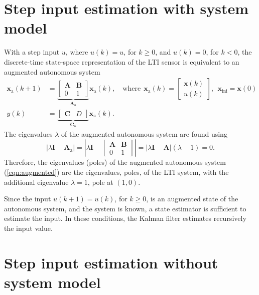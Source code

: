 \section{Step input estimation with system model}

With a step input ${u}$, where $u(k) = u$, for $k \geq 0$, and $u(k) = 0$, for $k < 0$, the discrete-time state-space representation of the LTI sensor is equivalent to an augmented autonomous system  
\begin{equation} \begin{aligned} \mathbf{x}_\text{a}(k+1) &= \underbrace{ \begin{bmatrix} \mathbf{A} & \mathbf{B} \\ 0 & 1 \end{bmatrix} }_{\mathbf{A}_\text{a}} \mathbf{x}_\text{a}(k) , \quad \text{where} \ \ \mathbf{x}_\text{a}(k) = \begin{bmatrix} \mathbf{x}(k) \\ {u}(k) \end{bmatrix}, \ \ \mathbf{x}_{\text{ini}} = \mathbf{x}(0) \\
{y}(k) &= \underbrace{ \begin{bmatrix} \mathbf{C} & D \end{bmatrix} }_{\mathbf{C}_\text{a}} \mathbf{x}_\text{a}(k) . \label{eqn:augmented} \end{aligned} \end{equation}
The eigenvalues $\lambda$ of the augmented autonomous system are found using
\[ \left| \lambda \mathbf{I} - \mathbf{A}_\text{a} \right| = \left| \lambda \mathbf{I} - \begin{bmatrix} \mathbf{A} & \mathbf{B} \\ 0 & 1 \end{bmatrix} \right| = \left| \lambda \mathbf{I} - \mathbf{A} \right| \left( \lambda - 1 \right) = 0.\]
Therefore, the eigenvalues (poles) of the augmented autonomous system (\ref{eqn:augmented}) are the eigenvalues, poles, of the LTI system, with the additional eigenvalue $\lambda = 1$, pole at $(1,0)$.  

Since the input ${u}(k+1) = {u}(k)$, for $k \geq 0$, is an augmented state of the autonomous system, and the system is known, a state estimator is sufficient to estimate the input.
In these conditions, the Kalman filter estimates recursively the input value.  

\section{Step input estimation without system model}

